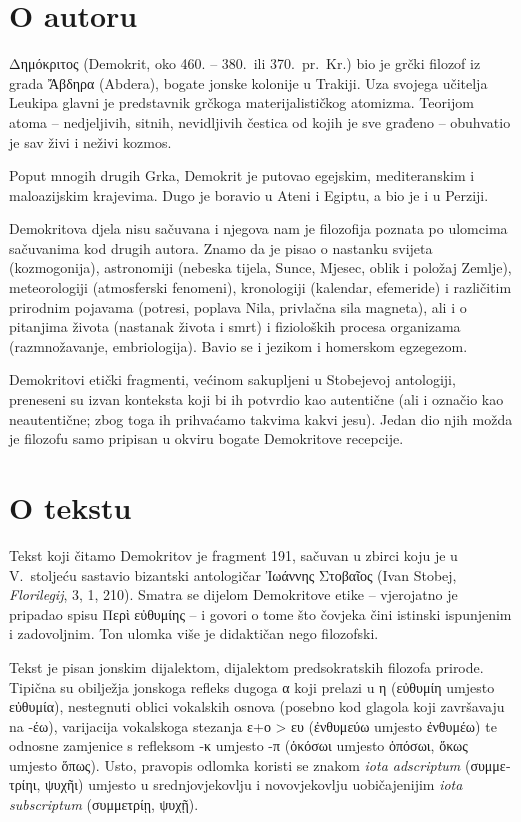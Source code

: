 
\section*{O autoru}

Δημόκριτος (Demokrit, oko 460. – 380.\ ili 370.\ pr.~Kr.) bio je grčki filozof iz grada Ἄβδηρα (Abdera), bogate jonske kolonije u Trakiji. Uza svojega učitelja Leukipa glavni je predstavnik grčkoga materijalističkog atomizma. Teorijom atoma – nedjeljivih, sitnih, nevidljivih čestica od kojih je sve građeno – obuhvatio je sav živi i neživi kozmos.

Poput mnogih drugih Grka, Demokrit je putovao egejskim, mediteranskim i maloazijskim krajevima. Dugo je boravio u Ateni i Egiptu, a bio je i u Perziji.

Demokritova djela nisu sačuvana i njegova nam je filozofija poznata po ulomcima sačuvanima kod drugih autora. Znamo da je pisao o nastanku svijeta (kozmogonija), astronomiji (nebeska tijela, Sunce, Mjesec, oblik i položaj Zemlje), meteorologiji (atmosferski fenomeni), kronologiji (kalendar, efemeride) i različitim prirodnim pojavama (potresi, poplava Nila, privlačna sila magneta), ali i o pitanjima života (nastanak života i smrt) i fizioloških procesa organizama (razmnožavanje, embriologija). Bavio se i jezikom i homerskom egzegezom.

Demokritovi etički fragmenti, većinom sakupljeni u Stobejevoj antologiji, preneseni su izvan konteksta koji bi ih potvrdio kao autentične (ali i označio kao neautentične; zbog toga ih prihvaćamo takvima kakvi jesu). Jedan dio njih možda je filozofu samo pripisan u okviru bogate Demokritove recepcije.

\section*{O tekstu}

Tekst koji čitamo Demokritov je fragment 191, sačuvan u zbirci koju je u V.~stoljeću sastavio bizantski antologičar \textgreek{Ἰωάννης Στοβαῖος} (Ivan Stobej, \textit{Florilegij}, 3, 1, 210). Smatra se dijelom Demokritove etike – vjerojatno je pripadao spisu Περὶ εὐθυμίης – i govori o tome što čovjeka čini istinski ispunjenim i zadovoljnim. Ton ulomka više je didaktičan nego filozofski.

Tekst je pisan jonskim dijalektom, dijalektom predsokratskih filozofa prirode. Tipična su obilježja jonskoga refleks dugoga α koji prelazi u η \textgreek{(εὐθυμίη} umjesto \textgreek{εὐθυμία),} nestegnuti oblici vokalskih osnova (posebno kod glagola koji završavaju na -έω), varijacija vokalskoga stezanja ε+ο > ευ \textgreek{(ἐνθυμεύω} umjesto \textgreek{ἐνθυμέω)} te odnosne zamjenice s refleksom -κ umjesto -π \textgreek{(ὁκόσωι} umjesto ὁπόσωι, ὅκως umjesto ὅπως). Usto, pravopis odlomka koristi se znakom \textit{iota adscriptum} \textgreek{(συμμετρίηι, ψυχῆι)} umjesto u srednjovjekovlju i novovjekovlju uobičajenijim \textit{iota subscriptum} \textgreek{(συμμετρίῃ, ψυχῇ).}

